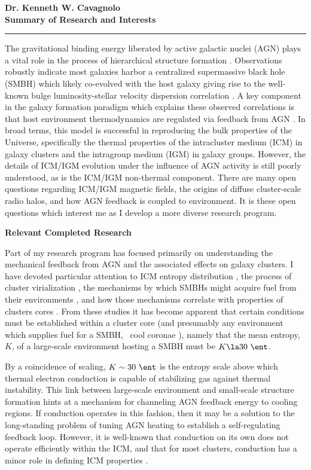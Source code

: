 \documentclass[12pt]{article}
\begin{document}
\begin{center}
{\large \textbf{Dr. Kenneth W. Cavagnolo\\Summary of Research and Interests}}
\rule{17cm}{2pt}
\end{center}
\normalsize

The gravitational binding energy liberated by active galactic nuclei
(AGN) plays a vital role in the process of hierarchical structure
formation \cite[\eg][]{perseus1, croton06, bower06, saro06, sijacki07,
  birzan08}. Observations robustly indicate most galaxies harbor a
centralized supermassive black hole (SMBH) which likely co-evolved
with the host galaxy giving rise to the well-known bulge
luminosity-stellar velocity dispersion correlation
\cite{1995ARA&A..33..581K, magorrian}. A key component in the galaxy
formation paradigm which explains these observed correlations is that
host environment thermodynamics are regulated via feedback from AGN
\cite{2002MNRAS.333..145N, mcnamrev}. In broad terms, this model is
successful in reproducing the bulk properties of the Universe,
specifically the thermal properties of the intracluster medium (ICM)
in galaxy clusters and the intragroup medium (IGM) in galaxy
groups. However, the details of ICM/IGM evolution under the influence
of AGN activity is still poorly understood, as is the ICM/IGM
non-thermal component. There are many open questions regarding ICM/IGM
magnetic fields, the origins of diffuse cluster-scale radio halos, and
how AGN feedback is coupled to environment. It is these open questions
which interest me as I develop a more diverse research program.

{\bf{Relevant Completed Research}}

Part of my research program has focused primarily on understanding the
mechanical feedback from AGN and the associated effects on galaxy
clusters. I have devoted particular attention to ICM entropy
distribution \cite{accept}, the process of cluster virialization
\cite{xrayband}, the mechanisms by which SMBHs might acquire fuel from
their environments \cite{conduction}, and how those mechanisms
correlate with properties of clusters cores \cite{haradent}. From
these studies it has become apparent that certain conditions must be
established within a cluster core (and presumably any environment
which supplies fuel for a SMBH, \eg\ cool coronae \cite{coronae}),
namely that the mean entropy, $K$, of a large-scale environment
hosting a SMBH must be $K \la 30~\ent$.

By a coincidence of scaling, $K \sim 30~\ent$ is the entropy scale
above which thermal electron conduction is capable of stabilizing gas
against thermal instability. This link between large-scale environment
and small-scale structure formation hints at a mechanism for
channeling AGN feedback energy to cooling regions. If conduction
operates in this fashion, then it may be a solution to the
long-standing problem of tuning AGN heating to establish a
self-regulating feedback loop. However, it is well-known that
conduction on its own does not operate efficiently within the ICM, and
that for most clusters, conduction has a minor role in defining ICM
properties \cite{2001ApJ...562L.129N, 2002ApJ...581..223R,
  2004MNRAS.347.1130V, dunn08}.
\end{document}
